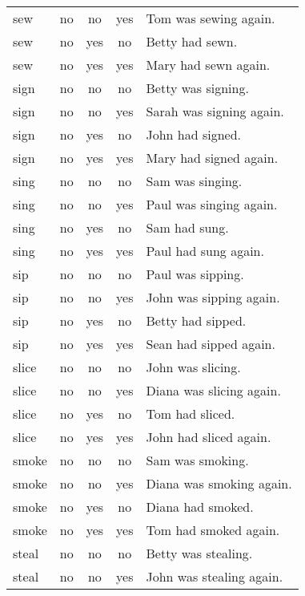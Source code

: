 \begin{longtable}{l|ccc|p{5cm}}
sew       & no   & no   & yes  & Tom was sewing again.       \\
sew       & no   & yes  & no   & Betty had sewn.             \\
sew       & no   & yes  & yes  & Mary had sewn again.        \\
sign      & no   & no   & no   & Betty was signing.          \\
sign      & no   & no   & yes  & Sarah was signing again.    \\
sign      & no   & yes  & no   & John had signed.            \\
sign      & no   & yes  & yes  & Mary had signed again.      \\
sing      & no   & no   & no   & Sam was singing.            \\
sing      & no   & no   & yes  & Paul was singing again.     \\
sing      & no   & yes  & no   & Sam had sung.               \\
sing      & no   & yes  & yes  & Paul had sung again.        \\
sip       & no   & no   & no   & Paul was sipping.           \\
sip       & no   & no   & yes  & John was sipping again.     \\
sip       & no   & yes  & no   & Betty had sipped.           \\
sip       & no   & yes  & yes  & Sean had sipped again.      \\
slice     & no   & no   & no   & John was slicing.           \\
slice     & no   & no   & yes  & Diana was slicing again.    \\
slice     & no   & yes  & no   & Tom had sliced.             \\
slice     & no   & yes  & yes  & John had sliced again.      \\
smoke     & no   & no   & no   & Sam was smoking.            \\
smoke     & no   & no   & yes  & Diana was smoking again.    \\
smoke     & no   & yes  & no   & Diana had smoked.           \\
smoke     & no   & yes  & yes  & Tom had smoked again.       \\
steal     & no   & no   & no   & Betty was stealing.         \\
steal     & no   & no   & yes  & John was stealing again.    \\

\end{longtable}
